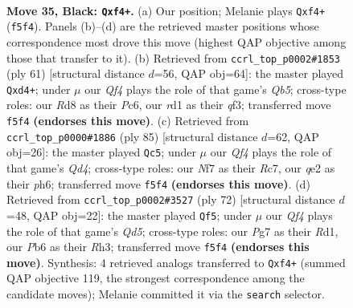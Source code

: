 \documentclass[11pt]{article}
\begin{document}
\clearpage

\begin{figure}[p]\centering
\begin{subfigure}{0.46\textwidth}\centering
\resizebox{\linewidth}{!}{%
\newchessgame
\chessboard[
  setfen={2kr4/p1p2npp/1p2p3/2p2qP1/5P2/2P4P/1P2Q3/2KR4 b - - 4 35},
  showmover=false,
  pgfstyle=straightmove, color=movearrow, markmove={f5-f4}
]}
\caption{}
\end{subfigure}\hfill
\begin{subfigure}{0.46\textwidth}\centering
\resizebox{\linewidth}{!}{%
\newchessgame
\chessboard[
  setfen={8/7k/1ppPp1pp/p7/Pq1P4/5Q1P/3r2P1/2R3K1 b - - 1 31},
  showmover=false,
  pgfstyle=straightmove, color=movearrow, markmove={b4-d4}
]}
\caption{}
\end{subfigure}
\\[4pt]
\begin{subfigure}{0.46\textwidth}\centering
\resizebox{\linewidth}{!}{%
\newchessgame
\chessboard[
  setfen={8/p1r2k1p/1pP2ppP/1P1qp3/3n4/3Q2P1/5PB1/1R4K1 b - - 8 43},
  showmover=false,
  pgfstyle=straightmove, color=movearrow, markmove={d5-c5}
]}
\caption{}
\end{subfigure}\hfill
\begin{subfigure}{0.46\textwidth}\centering
\resizebox{\linewidth}{!}{%
\newchessgame
\chessboard[
  setfen={3r2k1/2b2pPp/8/2pQ2P1/pqPpP2P/7R/2P1K3/3R4 w - - 3 37},
  showmover=false,
  pgfstyle=straightmove, color=movearrow, markmove={d5-f5}
]}
\caption{}
\end{subfigure}
\caption{\textbf{Move 35, Black: \texttt{Qxf4+}.} (a) Our position; Melanie plays \texttt{Qxf4+} (\texttt{f5f4}). Panels (b)--(d) are the retrieved master positions whose correspondence most drove this move (highest QAP objective among those that transfer to it). (b) Retrieved from \texttt{ccrl\_top\_p0002\#1853} (ply 61) [structural distance $d$=56, QAP obj=64]: the master played \texttt{Qxd4+}; under $\mu$ our \emph{Qf4} plays the role of that game's \emph{Qb5}; cross-type roles: our \emph{R}d8 as their \emph{P}c6, our \emph{r}d1 as their \emph{q}f3; transferred move \texttt{f5f4} \textbf{(endorses this move)}. (c) Retrieved from \texttt{ccrl\_top\_p0000\#1886} (ply 85) [structural distance $d$=62, QAP obj=26]: the master played \texttt{Qc5}; under $\mu$ our \emph{Qf4} plays the role of that game's \emph{Qd4}; cross-type roles: our \emph{N}f7 as their \emph{R}c7, our \emph{q}e2 as their \emph{p}h6; transferred move \texttt{f5f4} \textbf{(endorses this move)}. (d) Retrieved from \texttt{ccrl\_top\_p0002\#3527} (ply 72) [structural distance $d$=48, QAP obj=22]: the master played \texttt{Qf5}; under $\mu$ our \emph{Qf4} plays the role of that game's \emph{Qd5}; cross-type roles: our \emph{P}g7 as their \emph{R}d1, our \emph{P}b6 as their \emph{R}h3; transferred move \texttt{f5f4} \textbf{(endorses this move)}. Synthesis: 4 retrieved analogs transferred to \texttt{Qxf4+} (summed QAP objective 119, the strongest correspondence among the candidate moves); Melanie committed it via the \texttt{search} selector.}
\label{fig:thought-m69}
\end{figure}
\end{document}
